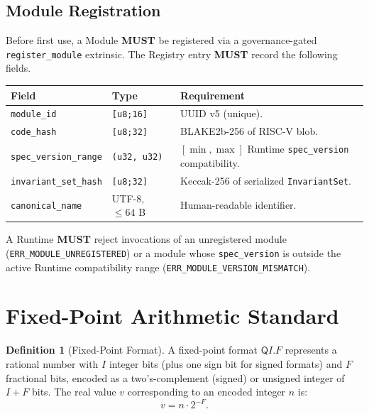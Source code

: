 \documentclass[11pt,letterpaper]{article}
\theoremstyle{definition}
\newtheorem{definition}{Definition}[section]
\newcommand{\MUST}{\textbf{MUST}}
\newcommand{\Qfmt}[2]{\ensuremath{\mathsf{Q}#1.#2}}   %
\begin{document}
\subsection{Module Registration}
\label{sec:registration}

Before first use, a Module \MUST{} be registered via a governance-gated \texttt{register\_module} extrinsic. The Registry entry \MUST{} record the following fields.

\begin{center}
\begin{tabular}{lll}
\toprule
\textbf{Field} & \textbf{Type} & \textbf{Requirement} \\
\midrule
\texttt{module\_id} & \texttt{[u8;16]} & UUID v5 (unique). \\
\texttt{code\_hash} & \texttt{[u8;32]} & BLAKE2b-256 of RISC-V blob. \\
\texttt{spec\_version\_range} & \texttt{(u32, u32)} & $[\min, \max]$ Runtime \texttt{spec\_version} compatibility. \\
\texttt{invariant\_set\_hash} & \texttt{[u8;32]} & Keccak-256 of serialized \texttt{InvariantSet}. \\
\texttt{canonical\_name} & UTF-8, $\le 64$ B & Human-readable identifier. \\
\bottomrule
\end{tabular}
\end{center}

\noindent A Runtime \MUST{} reject invocations of an unregistered module (\texttt{ERR\_MODULE\_UNREGISTERED}) or a module whose \texttt{spec\_version} is outside the active Runtime compatibility range (\texttt{ERR\_MODULE\_VERSION\_MISMATCH}).

\section{Fixed-Point Arithmetic Standard}
\label{sec:fixedpoint}

\begin{definition}[Fixed-Point Format]
\label{def:qformat}
A fixed-point format $\Qfmt{I}{F}$ represents a rational number with $I$ integer bits (plus one sign bit for signed formats) and $F$ fractional bits, encoded as a two's-complement (signed) or unsigned integer of $I + F$ bits. The real value $v$ corresponding to an encoded integer $n$ is:
\[
    v = n \cdot 2^{-F}.
\]
\end{definition}
\end{document}
